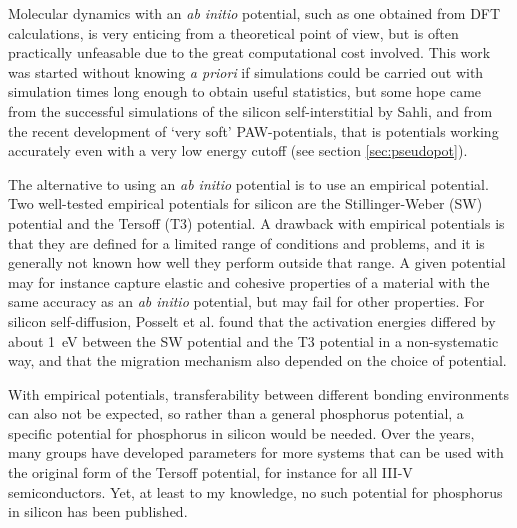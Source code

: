 \documentclass[11pt,bibliography=totoc,index=totoc]{scrbook}   %
\newcommand{\comment}[1]{\hl{#1}}
\begin{document}

Molecular dynamics with an \textit{ab initio} potential, such as one obtained from DFT calculations, is very enticing from a theoretical point of view,
but is often practically unfeasable due to the great computational cost involved.
This work was started without knowing \textit{a priori} if simulations could be carried out with simulation times long enough to obtain useful statistics,
but some hope came from the successful simulations of the silicon self-interstitial by Sahli,\cite{Sahli:2005}
and from the recent development of `very soft' PAW-potentials, that is potentials working accurately even with a very low energy cutoff (see section \ref{sec:pseudopot}).

The alternative to using an \textit{ab initio} potential is to use an empirical potential. 
Two well-tested empirical potentials for silicon are the Stillinger-Weber (SW) potential\cite{Stillinger:1985} and the Tersoff (T3) potential.\cite{Tersoff} 
A drawback with empirical potentials is that they are defined for a limited range of conditions and problems, 
and it is generally not known how well they perform outside that range.
A given potential may for instance capture elastic and cohesive properties of a material with the same accuracy as an \textit{ab initio} potential, 
but may fail for other properties.\cite{Powell:2007}
For silicon self-diffusion, Posselt et al. found that the activation energies differed by about 1~eV between the SW potential and the T3 potential in a non-systematic way, and that the migration mechanism also depended on the choice of potential.\cite{Posselt:2008}

With empirical potentials, transferability between different bonding environments can also not be expected, so rather than a general phosphorus potential, a specific potential for phosphorus in silicon would be needed.
Over the years, many groups have developed parameters for more systems that can be used with the original form of the Tersoff potential, for instance for all III-V semiconductors.\cite{Powell:2007}
Yet, at least to my knowledge, no such potential for phosphorus in silicon has been published.
\end{document}

